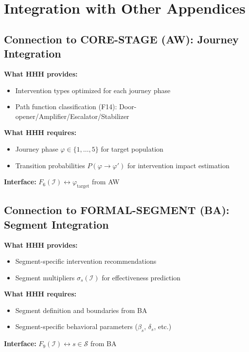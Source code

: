 \section{Integration with Other Appendices}
\label{sec:hhh-integration}

\subsection{Connection to CORE-STAGE (AW): Journey Integration}

\begin{tcolorbox}[colback=yellow!5!white, colframe=yellow!75!black,
    title=Integration: HHH $\leftrightarrow$ CORE-STAGE (AW)]
\textbf{What HHH provides:}
\begin{itemize}[nosep]
\item Intervention types optimized for each journey phase
\item Path function classification (F14): Door-opener/Amplifier/Escalator/Stabilizer
\end{itemize}

\textbf{What HHH requires:}
\begin{itemize}[nosep]
\item Journey phase $\varphi \in \{1, \ldots, 5\}$ for target population
\item Transition probabilities $P(\varphi \to \varphi')$ for intervention impact estimation
\end{itemize}

\textbf{Interface:} $F_6(\mathcal{I}) \leftrightarrow \varphi_{\text{target}}$ from AW
\end{tcolorbox}

\subsection{Connection to FORMAL-SEGMENT (BA): Segment Integration}

\begin{tcolorbox}[colback=yellow!5!white, colframe=yellow!75!black,
    title=Integration: HHH $\leftrightarrow$ FORMAL-SEGMENT (BA)]
\textbf{What HHH provides:}
\begin{itemize}[nosep]
\item Segment-specific intervention recommendations
\item Segment multipliers $\sigma_s(\mathcal{I})$ for effectiveness prediction
\end{itemize}

\textbf{What HHH requires:}
\begin{itemize}[nosep]
\item Segment definition and boundaries from BA
\item Segment-specific behavioral parameters ($\beta_s$, $\delta_s$, etc.)
\end{itemize}

\textbf{Interface:} $F_9(\mathcal{I}) \leftrightarrow s \in \mathcal{S}$ from BA
\end{tcolorbox}

